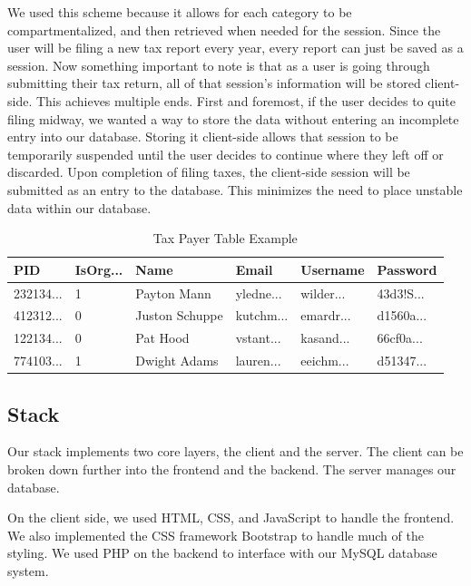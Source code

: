 \documentclass[sigconf]{acmart}
\begin{document}
We used this scheme because it allows for each category to be compartmentalized, and then retrieved when needed for the session. Since the user will be filing a new tax report every year, every report can just be saved as a session. Now something important to note is that as a user is going through submitting their tax return, all of that session's information will be stored client-side. This achieves multiple ends. First and foremost, if the user decides to quite filing midway, we wanted a way to store the data without entering an incomplete entry into our database. Storing it client-side allows that session to be temporarily suspended until the user decides to continue where they left off or discarded. Upon completion of filing taxes, the client-side session will be submitted as an entry to the database. This minimizes the need to place unstable data within our database.

\begin{table}[H]
\begin{center}
  \caption{Tax Payer Table Example}
\begin{tabularx}{0.45\textwidth} { | m{1cm} | m{.8cm} | m{1cm} | m{1cm} | m{1cm} | m{1cm} | }
 \hline
 PID & IsOrg... & Name & Email & Username & Password \\
 \hline
 \hline
 232134... & 1 & Payton Mann & yledne... & wilder... & 43d3!S...\\
 \hline
 412312... & 0 & Juston Schuppe & kutchm... & emardr... & d1560a...\\
 \hline
 122134... & 0 & Pat Hood & vstant... & kasand... & 66cf0a...\\
 \hline
 774103... & 1 & Dwight Adams & lauren... & eeichm... & d51347...\\
 \hline
\end{tabularx}
\end{center}
\end{table}

\subsection{Stack}
Our stack implements two core layers, the client and the server. The client can be broken down further into the frontend and the backend. The server manages our database.

On the client side, we used HTML, CSS, and JavaScript to handle the frontend. We also implemented the CSS framework Bootstrap to handle much of the styling. We used PHP on the backend to interface with our MySQL database system.
\end{document}
